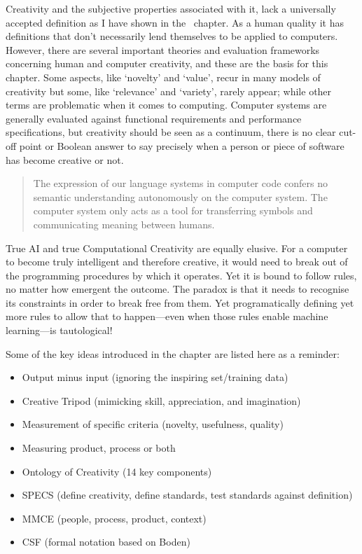 Creativity and the subjective properties associated with it, lack a universally accepted definition as I have shown in the~ chapter. As a human quality it has definitions that don’t necessarily lend themselves to be applied to computers. However, there are several important theories and evaluation frameworks concerning human and computer creativity, and these are the basis for this chapter. Some aspects, like `novelty' and `value', recur in many models of creativity but some, like `relevance' and `variety', rarely appear; while other terms are problematic when it comes to computing. Computer systems are generally evaluated against functional requirements and performance specifications, but creativity should be seen as a continuum, there is no clear cut-off point or Boolean answer to say precisely when a person or piece of software has become creative or not.

\begin{quotation}
  The expression of our language systems in computer code confers no semantic understanding autonomously on the computer system. The computer system only acts as a tool for transferring symbols and communicating meaning between humans. 
\end{quotation}

True \ac{AI} and true Computational Creativity are equally elusive. For a computer to become truly intelligent and therefore creative, it would need to break out of the programming procedures by which it operates. Yet it is bound to follow rules, no matter how emergent the outcome. The paradox is that it needs to recognise its constraints in order to break free from them. Yet programatically defining yet more rules to allow that to happen---even when those rules enable machine learning---is tautological!

\spirals

Some of the key ideas introduced in the  chapter are listed here as a reminder:

\begin{itemize}
  \item Output minus input (ignoring the inspiring set/training data)
  \item Creative Tripod (mimicking skill, appreciation, and imagination)
  \item Measurement of specific criteria (novelty, usefulness, quality)
  \item Measuring product, process or both
  \item Ontology of Creativity (14 key components)
  \item \ac{SPECS} (define creativity, define standards, test standards against definition)
  \item \ac{MMCE} (people, process, product, context)
  \item \ac{CSF} (formal notation based on Boden)
\end{itemize}


